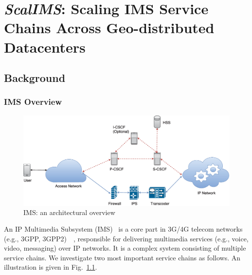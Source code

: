 \chapter {\textit{ScalIMS}: Scaling IMS Service Chains Across Geo-distributed Datacenters}
\label{ch:scalims}

\section{Background} \label{Background}
\subsection{IMS Overview}

\begin{figure}[!h]
        \centering
        \includegraphics[width=1\columnwidth]{chap-scalims/figure/IMS_architecture.eps}
        \caption{IMS: an architectural overview}
        \label{fig:IMS_architecture}
\end{figure}

An IP Multimedia Subsystem (IMS)~\cite{3gpp-ims} is a core part in 3G/4G telecom networks (e.g., 3GPP, 3GPP2)~\cite{umts}~\cite{lte}, responsible for delivering multimedia services (e.g., voice, video, messaging) over IP networks. It is a complex system consisting of multiple service chains. We investigate two most important service chains as follows. An illustration is given in Fig.~\ref{fig:IMS_architecture}.

